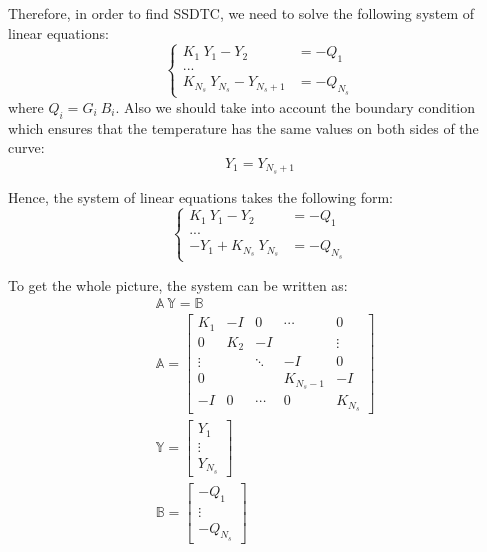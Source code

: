 Therefore, in order to find SSDTC, we need to solve the following system of linear equations:
\[
  \begin{cases}
    K_1 \: Y_1 - Y_2 & = -Q_1 \\
    ... \\
    K_{N_s} \: Y_{N_s} - Y_{N_s + 1} & = -Q_{N_s}
  \end{cases}
\]
where $Q_i = G_i \: B_i$. Also we should take into account the boundary condition which ensures that the temperature has the same values on both sides of the curve:
\begin{equation} \label{eq:boundary-condition}
  Y_1 = Y_{N_s + 1}
\end{equation}

Hence, the system of linear equations takes the following form:
\[
  \begin{cases}
    K_1 \: Y_1 - Y_2 & = -Q_1 \\
    ... \\
    -Y_1 + K_{N_s} \: Y_{N_s} & = -Q_{N_s}
  \end{cases}
\]

To get the whole picture, the system can be written as:
\begin{align}
  & \mathbb{A} \: \mathbb{Y} = \mathbb{B} \label{eq:system} \\
  & \mathbb{A} = \left[
    \begin{array}{ccccc}
      K_1 & -I & 0 & \cdots & 0 \\
      0 & K_2 & -I &  & \vdots \\
      \vdots &  & \ddots & -I & 0 \\
      0 &  &  & K_{N_s - 1} & -I \\
      -I & 0 & \cdots & 0 & K_{N_s}
    \end{array}
  \right] \nonumber \\
  & \mathbb{Y} = \left[
    \begin{array}{c}
      Y_1 \\
      \vdots \\
      Y_{N_s}
    \end{array}
  \right] \nonumber \\
  & \mathbb{B} = \left[
    \begin{array}{c}
      -Q_1 \\
      \vdots \\
      -Q_{N_s}
    \end{array}
  \right] \nonumber
\end{align}

